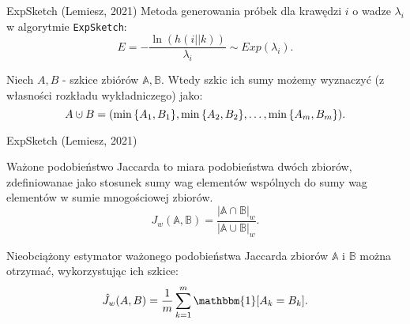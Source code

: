 \begin{frame}[squeeze]{ExpSketch (Lemiesz, 2021)}
    Metoda generowania próbek dla krawędzi $i$ o wadze $\lambda_i$ w algorytmie \texttt{ExpSketch}:
    \[
        E = - \frac{\ln(h(i || k))}{\lambda_i} \sim Exp(\lambda_i).
    \]

    \begin{twierdzenie}
        Niech $A, B$ - szkice zbiórów $\mathbb{A}, \mathbb{B}$. Wtedy szkic ich sumy możemy wyznaczyć (z własności rozkładu wykładniczego) jako:
        \[
            A \mathbin{\mathaccent\cdot\cup} B = (\min{\{A_1, B_1\}}, \min{\{A_2, B_2\}}, \dots, \min{\{A_m, B_m\}}).
        \]
    \end{twierdzenie}

\end{frame}

\begin{frame}[squeeze]{ExpSketch (Lemiesz, 2021)}
    \begin{definicja}
        Ważone podobieństwo Jaccarda to miara podobieństwa dwóch zbiorów, zdefiniowanae jako stosunek sumy wag elementów wspólnych do sumy wag elementów w sumie mnogościowej zbiorów.
        \[
            J_w(\mathbb{A}, \mathbb{B}) = \frac{|\mathbb{A} \cap \mathbb{B}|_w}{|\mathbb{A} \cup \mathbb{B}|_w}.
        \]
    \end{definicja}

    \begin{twierdzenie}
        Nieobciążony estymator ważonego podobieństwa Jaccarda zbiorów $\mathbb{A}$ i $\mathbb{B}$ można otrzymać, wykorzystując ich szkice:
        \[
            \hat{J}_w(A, B) = \frac{1}{m} \sum\limits_{k = 1}^{m} \mathbbm{1}[A_k = B_k].  
        \]
    \end{twierdzenie}
\end{frame}